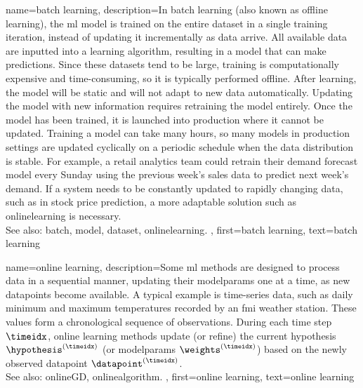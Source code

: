 {name={batch learning},
	description={In \gls{batch} learning (also known as offline learning), the \gls{ml} \gls{model} 
		is trained on the entire \gls{dataset} in a single training iteration, instead of updating it incrementally as \gls{data} arrive. 
		All available \gls{data} are inputted into a learning \gls{algorithm}, resulting in a \gls{model} that can make \glspl{prediction}. 
		Since these \glspl{dataset} tend to be large, training is computationally expensive and time-consuming, 
		so it is typically performed offline. After learning, the \gls{model} will be static and will not adapt to new \gls{data} automatically. 
		Updating the \gls{model} with new information requires retraining the \gls{model} entirely. Once the \gls{model} has been trained, 
		it is launched into production where it cannot be updated. Training a \gls{model} can take many hours, so many \glspl{model} in production 
		settings are updated cyclically on a periodic schedule when the \gls{data} distribution is stable. For example, a retail analytics team 
		could retrain their demand forecast \gls{model} every Sunday using the previous week's sales \gls{data} to predict next week's demand. 
		If a system needs to be constantly updated to rapidly changing \gls{data}, such as in stock price \gls{prediction}, a more adaptable solution 
		such as \gls{onlinelearning} is necessary.
		\\
		See also: \gls{batch}, \gls{model}, \gls{dataset}, \gls{onlinelearning}. },
	first={batch learning}, 
	text={batch learning}
}

{name={online learning},
	description={Some \gls{ml} methods  are designed to 
	    process \gls{data} in a sequential manner, updating their \glspl{modelparam} 
		one at a time, as new \glspl{datapoint} become available. A typical example 
		is time-series \gls{data}, such as daily \gls{minimum} and \gls{maximum} 
		temperatures recorded by an \gls{fmi} weather station. These values form 
		a chronological sequence of observations. During each time step $\timeidx$, 
		online learning methods update (or refine) the current \gls{hypothesis} $\hypothesis^{(\timeidx)}$ (or \glspl{modelparam} $\weights^{(\timeidx)}$) 
		based on the newly observed \gls{datapoint} $\datapoint^{(\timeidx)}$. 
		\\ 
		See also: \gls{onlineGD}, \gls{onlinealgorithm}. },
	first={online learning},
	text={online learning} 
}

